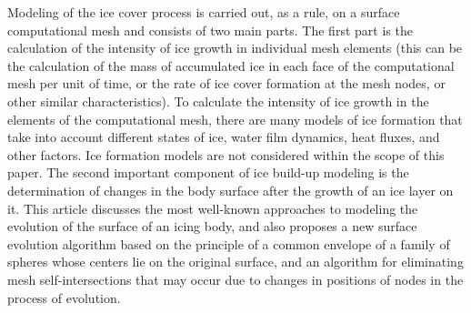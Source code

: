 \documentclass[
11pt,%
tightenlines,%
twoside,%
onecolumn,%
nofloats,%
nobibnotes,%
nofootinbib,%
superscriptaddress,%
noshowpacs,%
centertags]%
{revtex4-2}
\begin{document}
Modeling of the ice cover process is carried out, as a rule, on a surface computational mesh and consists of two main parts.
The first part is the calculation of the intensity of ice growth in individual mesh elements (this can be the calculation of the mass of accumulated ice in each face of the computational mesh per unit of time, or the rate of ice cover formation at the mesh nodes, or other similar characteristics).
To calculate the intensity of ice growth in the elements of the computational mesh, there are many models of ice formation \cite{Bartkus,Zhang,Pena} that take into account different states of ice, water film dynamics, heat fluxes, and other factors.
Ice formation models are not considered within the scope of this paper.
The second important component of ice build-up modeling is the determination of changes in the body surface after the growth of an ice layer on it.
This article discusses the most well-known approaches to modeling the evolution of the surface of an icing body, and also proposes a new surface evolution algorithm based on the principle of a common envelope of a family of spheres whose centers lie on the original surface, and an algorithm for eliminating mesh self-intersections that may occur due to changes in positions of nodes in the process of evolution.
\end{document}

